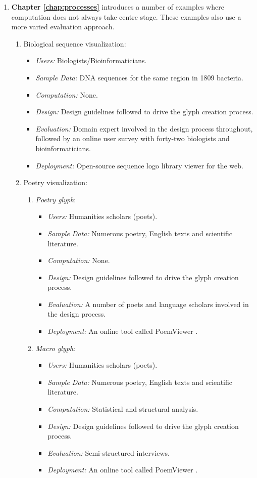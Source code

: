 \begin{enumerate}
\item \textbf{Chapter \ref{chap:processes}} introduces a number of examples where computation does not always take centre stage.
These examples also use a more varied evaluation approach.
\begin{enumerate}
\item Biological sequence visualization:
\begin{itemize}
\item \emph{Users:} Biologists/Bioinformaticians.
\item \emph{Sample Data:} DNA sequences for the same region in 1809 bacteria.
\item \emph{Computation:} None.
\item \emph{Design:} Design guidelines followed to drive the glyph creation process.
\item \emph{Evaluation:} Domain expert involved in the design process throughout, followed by an online user survey with forty-two biologists and bioinformaticians.
\item \emph{Deployment:} Open-source sequence logo library viewer for the web.
\end{itemize}
\item Poetry visualization:
\begin{enumerate}
\item \emph{Poetry glyph}:
\begin{itemize}
\item \emph{Users:} Humanities scholars (poets).
\item \emph{Sample Data:} Numerous poetry, English texts and scientific literature.
\item \emph{Computation:} None.
\item \emph{Design:} Design guidelines followed to drive the glyph creation process.
\item \emph{Evaluation:} A number of poets and language scholars involved in the design process.
\item \emph{Deployment:} An online tool called PoemViewer \cite{CGF:Abd2013a}.
\end{itemize}
\item \emph{Macro glyph}:
\begin{itemize}
\item \emph{Users:} Humanities scholars (poets).
\item \emph{Sample Data:} Numerous poetry, English texts and scientific literature.
\item \emph{Computation:} Statistical and structural analysis.
\item \emph{Design:} Design guidelines followed to drive the glyph creation process.
\item \emph{Evaluation:} Semi-structured interviews.
\item \emph{Deployment:} An online tool called PoemViewer \cite{CGF:Abd2013a}.


\end{itemize}
\end{enumerate}
\end{enumerate}
\end{enumerate}
